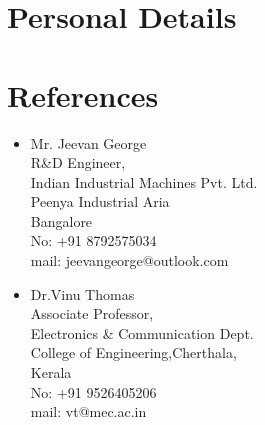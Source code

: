 \documentclass[11pt,a4paper,sans]{moderncv}      	%
\begin{document}
			\section{Personal Details}
			\begin{cvcolumns}
			\end{cvcolumns}
		
			\section{References}
			\begin{cvcolumns}
			\cvcolumn{}
			{\begin{itemize}
				\item Mr. Jeevan George\\R\&D Engineer,\\Indian Industrial Machines Pvt. Ltd.\\Peenya Industrial Aria\\Bangalore\\No: +91 8792575034\\mail: jeevangeorge@outlook.com
			\end{itemize}
			}
			
			\cvcolumn{}
			{
			\begin{itemize}
				\item Dr.Vinu Thomas\\Associate Professor,\\Electronics \& Communication Dept.\\College of Engineering,Cherthala,\\Kerala\\No: +91 9526405206\\mail: vt@mec.ac.in  
			\end{itemize}
			}
					
			\end{cvcolumns}
		
					\nocite{*}
					
		
		
					\clearpage
					
\end{document}
